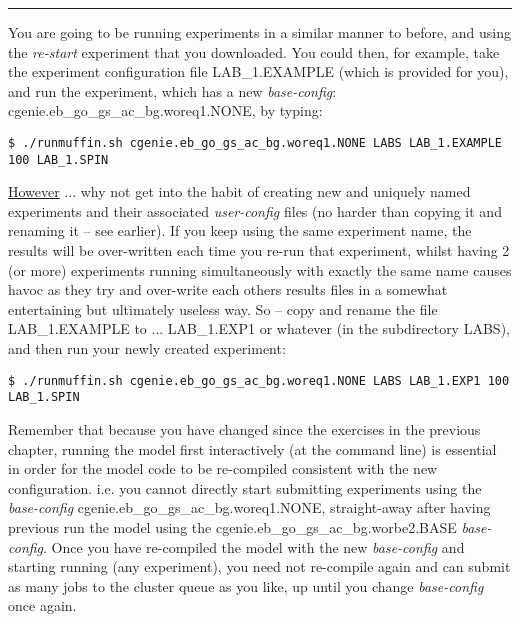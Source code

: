\documentclass[11pt,fleqn]{book} %
\begin{document}
\vspace{1mm}
\noindent\rule{4cm}{0.5pt}
\vspace{2mm}

\noindent You are going to be running experiments in a similar manner to before, and using the \textit{re-start} experiment that you downloaded. You could then, for example, take the experiment configuration file \textsf{\footnotesize LAB\_1.EXAMPLE} (which is provided for you), and run the experiment, which has a new \textit{base-config}: \textsf{\footnotesize cgenie.eb\_go\_gs\_ac\_bg.woreq1.NONE}, by typing:
\vspace{-1mm}
\small\begin{verbatim}
$ ./runmuffin.sh cgenie.eb_go_gs_ac_bg.woreq1.NONE LABS LAB_1.EXAMPLE 100 LAB_1.SPIN
\end{verbatim}\normalsize
\noindent \uline{However} ... why not get into the habit of creating new and uniquely named experiments and their associated \textit{user-config} files (no harder than copying it and renaming it -- see earlier). If you keep using the same experiment name, the results will be over-written each time you re-run that experiment, whilst having  2 (or more) experiments running simultaneously with exactly the same name causes havoc as they try and over-write each others results files in a somewhat entertaining but ultimately useless way. So -- copy and rename the file \textsf{\footnotesize LAB\_1.EXAMPLE} to ... \textsf{\footnotesize LAB\_1.EXP1} or whatever (in the subdirectory \textsf{\footnotesize LABS}), and then run your newly created experiment:
\vspace{-1mm}
\small\begin{verbatim}
$ ./runmuffin.sh cgenie.eb_go_gs_ac_bg.woreq1.NONE LABS LAB_1.EXP1 100 LAB_1.SPIN
\end{verbatim}\normalsize

Remember that because you have changed since the exercises in the previous chapter, running the model first interactively (at the command line) is essential in order for the model code to be re-compiled consistent with the new configuration. i.e. you cannot directly start submitting experiments using the \textit{base-config} \textsf{\footnotesize cgenie.eb\_go\_gs\_ac\_bg.woreq1.NONE}, straight-away after having previous run the model using the \textsf{\footnotesize cgenie.eb\_go\_gs\_ac\_bg.worbe2.BASE} \textit{base-config}. Once you have re-compiled the model with the new \textit{base-config} and starting running (any experiment), you need not re-compile again and can submit as many jobs to the cluster queue as you like, up until you change \textit{base-config} once again.
\end{document}
